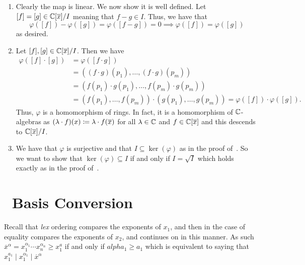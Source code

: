 \documentclass[letterpaper, 11pt, oneside]{book}
\begin{document}
\begin{sol}\label{ex:UAG_2.2.12}
  \begin{enumerate}
    \item Clearly the map is linear.
          We now show it is well defined.
          Let $[f] = [g] \in \mathbb{C}[\overline{x}] / I$ meaning that $f - g \in I$.
          Thus, we have that
          \[
            \varphi([f]) - \varphi([g]) = \varphi([f - g]) = 0 \implies \varphi([f]) = \varphi([g])
          \]
          as desired.
    \item Let $[f], [g] \in \mathbb{C}[\overline{x}] / I$. Then we have
          \begin{align*}
            \varphi([f] \cdot [g]) &= \varphi([f \cdot g]) \\
                                   &= ((f \cdot g)(p_{1}), \ldots, (f \cdot g)(p_{m})) \\
                                   &= (f(p_{1}) \cdot g(p_{1}), \ldots, f(p_{m}) \cdot g(p_{m})) \\
                                   &= (f(p_{1}), \ldots, f(p_{m})) \cdot (g(p_{1}), \ldots, g(p_{m})) = \varphi([f]) \cdot \varphi([g]).
          \end{align*}
          Thus, $\varphi$ is a homomorphism of rings.
          In fact, it is a homomorphism of $\mathbb{C}$-algebras as $(\lambda \cdot f)(x) \coloneqq \lambda \cdot f(\overline{x})$ for all $\lambda \in \mathbb{C}$ and $f \in \mathbb{C}[\overline{x}]$ and this descends to $\mathbb{C}[\overline{x}] / I$.
    \item We have that $\varphi$ is surjective and that $I \subseteq \ker(\varphi)$ as in the proof of~\cite[Theorem 2.10]{book:UAG}.
          So we want to show that $\ker(\varphi) \subseteq I$ if and only if $I = \sqrt{I}$ which holds exactly as in the proof of~\cite[Theorem 2.10]{book:UAG}.
  \end{enumerate}
\end{sol}

\clearpage

\section{\Grobner\ Basis Conversion}

\begin{sol}\label{ex:UAG_2.3.2}
  Recall that \emph{lex} ordering compares the exponents of $x_{1}$, and then in the case of equality compares the exponents of $x_{2}$, and continues on in this manner.
  As such $\overline{x}^{\alpha} = x_{1}^{\alpha_{1}} \cdots x_{n}^{\alpha_{n}} \geq x_{1}^{a}$ if and only if $alpha_{1} \geq a_{1}$ which is equivalent to saying that $x_{1}^{a_{1}} \mid x_1^{\alpha_{1}} \mid \overline{x}^{\alpha}$
\end{sol}
\end{document}
